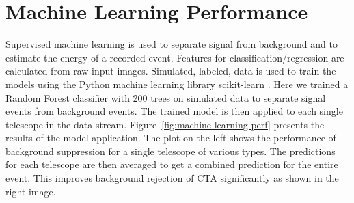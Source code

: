 \documentclass[11pt,twoside]{article}
\begin{document}


\section{Machine Learning Performance}


Supervised machine learning is used to separate signal from background and to estimate the energy of a recorded event.
Features for classification/regression are calculated from raw input images.
Simulated, labeled, data is used to train the models using the Python machine learning library scikit-learn \citep{sklearn}.
Here we trained a Random Forest classifier with 200 trees on simulated data to separate signal events from background events. 
The trained model is then applied to each single telescope in the data stream. 
Figure~\ref{fig:machine-learning-perf} presents the results of the model application.
The plot on the left shows the performance of background suppression for a single telescope of various types.
The predictions for each telescope are then averaged to get a combined prediction for the entire event.
This improves background rejection of CTA significantly as shown in the right image.






\end{document}
